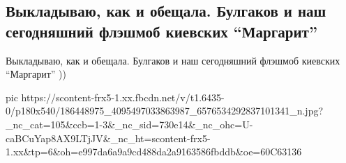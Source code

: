  
 
 
 
 

\subsection{Выкладываю, как и обещала. Булгаков и наш сегодняшний флэшмоб киевских \enquote{Маргарит}}

Выкладываю, как и обещала. Булгаков и наш сегодняшний флэшмоб киевских
\enquote{Маргарит} ))

\ifcmt
  pic https://scontent-frx5-1.xx.fbcdn.net/v/t1.6435-0/p180x540/186448975_4095497033863987_6576534292837101341_n.jpg?_nc_cat=105&ccb=1-3&_nc_sid=730e14&_nc_ohc=U-caBCuYap8AX9LTjJV&_nc_ht=scontent-frx5-1.xx&tp=6&oh=e997da6a9a9cd488da2a9163586fbddb&oe=60C63136
\fi

